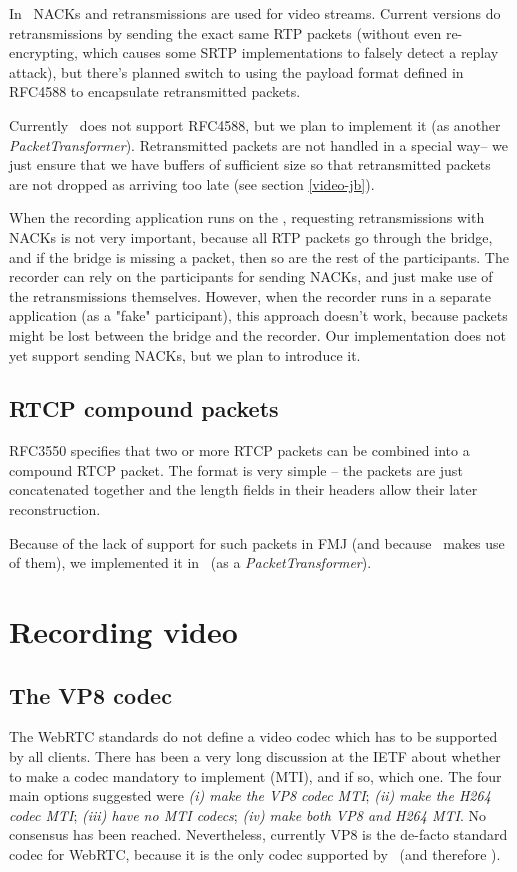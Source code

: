 \documentclass[twoside,openright,a4paper,12pt,english]{article}
\begin{document}
In \wrtc\ NACKs and retransmissions are used for
video streams. Current versions do retransmissions by sending the exact same
RTP packets (without even re-encrypting, which causes some SRTP implementations
to falsely detect a replay attack), but there's planned switch to using the
payload format defined in RFC4588\cite{rfc4588} to encapsulate retransmitted packets.

Currently \lj\ does not support RFC4588, but we plan to implement it (as
another \emph{PacketTransformer}). Retransmitted packets are not handled in a
special way-- we just ensure that we have
buffers of sufficient size so that retransmitted packets are not dropped as arriving too late (see section \ref{video-jb}).

\medskip
When the recording application runs on the \jvb, requesting retransmissions with NACKs is not
very important, because all RTP packets go through the bridge, and if the
bridge is missing a packet, then so are the rest of the participants. The recorder can
rely on the participants for sending NACKs, and just make use of the retransmissions themselves.  
However, when the recorder runs in a separate application (as a "fake"
participant), this approach doesn't work, because packets might be lost between
the bridge and the recorder. Our implementation does not yet support sending NACKs, but we plan
to introduce it.




\subsection{RTCP compound packets}
RFC3550 specifies that two or more RTCP packets can be combined into a compound
RTCP packet. The format is very simple -- the packets are just concatenated
together and the length fields in their headers allow their later
reconstruction.

Because of the lack of support for such packets in FMJ (and because \wrtc\
makes use of them), we implemented it in \lj\ (as a \emph{PacketTransformer}).




\section{Recording video}
\label{recording-video}
\subsection{The VP8 codec}
The WebRTC standards do not define a video codec which has to be supported by all clients. There
has been a very long discussion at the IETF
about whether to make a codec mandatory to implement (MTI), and if so, which one. The
four main options suggested were
\emph{(i) make the VP8 codec MTI};
\emph{(ii) make the H264 codec MTI};
\emph{(iii) have no MTI codecs};
\emph{(iv) make both VP8 and H264 MTI}. No consensus has been reached.
Nevertheless, currently VP8 is the de-facto standard codec for WebRTC, because
it is the only codec supported by \wrtc\ (and therefore \jm).
\end{document}
